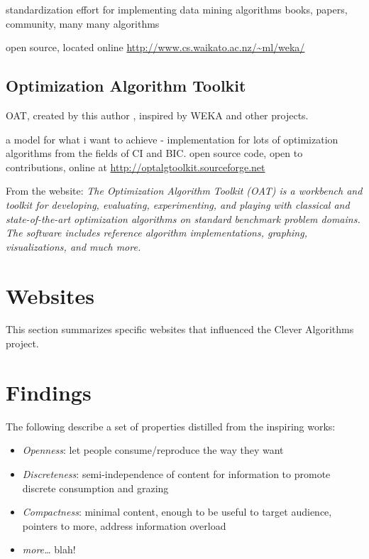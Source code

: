 \documentclass[a4paper, 11pt]{article}
\begin{document}
standardization effort for implementing data mining algorithms \cite{Hall2009}
books, papers, community, many many algorithms

open source, located online \url{http://www.cs.waikato.ac.nz/~ml/weka/}

\subsection{Optimization Algorithm Toolkit}
OAT, created by this author \cite{Brownlee2007}, inspired by WEKA and other projects.

a model for what i want to achieve - implementation for lots of optimization algorithms from the fields of CI and BIC. open source code, open to contributions, online at \url{http://optalgtoolkit.sourceforge.net}

From the website: 
\emph{The Optimization Algorithm Toolkit (OAT) is a workbench and toolkit for developing, evaluating, experimenting, and playing with classical and state-of-the-art optimization algorithms on standard benchmark problem domains. The software includes reference algorithm implementations, graphing, visualizations, and much more.}


\section{Websites}
\label{sec:websites}
This section summarizes specific websites that influenced the Clever Algorithms project.


\section{Findings}
\label{sec:findings}

The following describe a set of properties distilled from the inspiring works:

\begin{itemize}
	\item \emph{Openness}: let people consume/reproduce the way they want
	\item \emph{Discreteness}: semi-independence of content for information to promote discrete consumption and grazing
	\item \emph{Compactness}: minimal content, enough to be useful to target audience, pointers to more, address information overload 
	\item \emph{more\ldots} blah!
\end{itemize}





\end{document}
